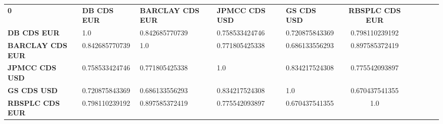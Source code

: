 \begin{center}
 \begin{tabular}{|l|l|l|l|l|c|c|c|c|c|}
\hline
\textbf{0} & \textbf{DB CDS EUR} & \textbf{BARCLAY CDS EUR} & \textbf{JPMCC CDS USD} & \textbf{GS CDS USD} & \textbf{RBSPLC CDS EUR}\\\hhline{|=|=|=|=|=|=|}
\textbf{DB CDS EUR} & 1.0 & 0.842685770739 & 0.758533424746 & 0.720875843369 & 0.798110239192\\
\textbf{BARCLAY CDS EUR} & 0.842685770739 & 1.0 & 0.771805425338 & 0.686133556293 & 0.897585372419\\
\textbf{JPMCC CDS USD} & 0.758533424746 & 0.771805425338 & 1.0 & 0.834217524308 & 0.775542093897\\
\textbf{GS CDS USD} & 0.720875843369 & 0.686133556293 & 0.834217524308 & 1.0 & 0.670437541355\\
\textbf{RBSPLC CDS EUR} & 0.798110239192 & 0.897585372419 & 0.775542093897 & 0.670437541355 & 1.0\\
\hline
\end{tabular}
\end{center}